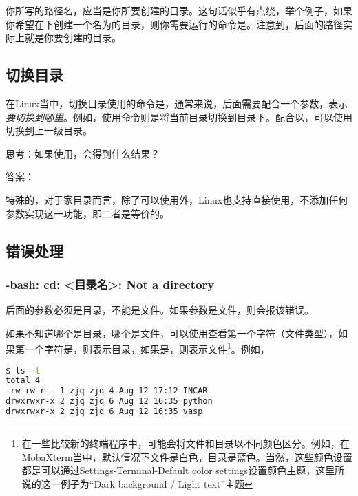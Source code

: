 \begin{attention}
    你所写的路径名，应当是你所要创建的目录。这句话似乎有点绕，举个例子，如果你希望在下创建一个名为的目录，则你需要运行的命令是。注意到，后面的路径实际上就是你要创建的目录。
\end{attention}

\subsection{切换目录}\label{subsec:目录操作-切换目录}

在Linux当中，切换目录使用的命令是，通常来说，后面需要配合一个参数，表示\emph{要切换到哪里}。例如，使用命令则是将当前目录切换到目录下。配合以，可以使用切换到上一级目录。

思考：如果使用，会得到什么结果？

答案：

特殊的，对于家目录而言，除了可以使用外，Linux也支持直接使用，不添加任何参数实现这一功能，即二者是等价的。

\subsection{错误处理}\label{subsec:目录操作-错误处理}

\subsubsection{-bash: cd: <目录名>: Not a directory}

后面的参数必须是目录，不能是文件。如果参数是文件，则会报该错误。

如果不知道哪个是目录，哪个是文件，可以使用查看第一个字符（文件类型），如果第一个字符是，则表示目录，如果是\code{-}，则表示文件\footnote{在一些比较新的终端程序中，可能会将文件和目录以不同颜色区分。例如，在MobaXterm当中，默认情况下文件是白色，目录是蓝色。当然，这些颜色设置都是可以通过Settings-Terminal-Default color settings设置颜色主题，这里所说的这一例子为“Dark background / Light text”主题}。例如，

\begin{lstlisting}[language=bash]
$ ls -l
total 4
-rw-rw-r-- 1 zjq zjq 4 Aug 12 17:12 INCAR
drwxrwxr-x 2 zjq zjq 6 Aug 12 16:35 python
drwxrwxr-x 2 zjq zjq 6 Aug 12 16:35 vasp
\end{lstlisting}

